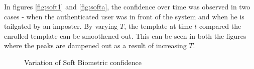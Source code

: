 \documentclass[%
        final,
        notitlepage,
        narroweqnarray,
        inline,
        ]{ieee}
\begin{document}
In figures \ref{fig:soft1} and \ref{fig:softa}, the confidence over time was observed in two cases - when the authenticated user was in front of the system and when he is tailgated by an imposter.
By varying $T$, the template at time $t$ compared the enrolled template can be smoothened out.
This can be seen in both the figures where the peaks are dampened out as a result of increasing $T$.

\begin{figure}
	\centering
	\quad
	\caption{Variation of Soft Biometric confidence}
\end{figure}
\end{document}
